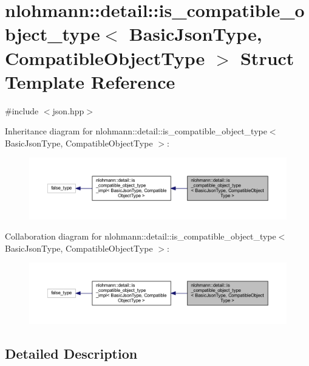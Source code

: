 \hypertarget{structnlohmann_1_1detail_1_1is__compatible__object__type}{}\section{nlohmann\+::detail\+::is\+\_\+compatible\+\_\+object\+\_\+type$<$ Basic\+Json\+Type, Compatible\+Object\+Type $>$ Struct Template Reference}
\label{structnlohmann_1_1detail_1_1is__compatible__object__type}


{\ttfamily \#include $<$json.\+hpp$>$}



Inheritance diagram for nlohmann\+::detail\+::is\+\_\+compatible\+\_\+object\+\_\+type$<$ Basic\+Json\+Type, Compatible\+Object\+Type $>$\+:
\nopagebreak
\begin{figure}[H]
\begin{center}
\leavevmode
\includegraphics[width=350pt]{structnlohmann_1_1detail_1_1is__compatible__object__type__inherit__graph}
\end{center}
\end{figure}


Collaboration diagram for nlohmann\+::detail\+::is\+\_\+compatible\+\_\+object\+\_\+type$<$ Basic\+Json\+Type, Compatible\+Object\+Type $>$\+:
\nopagebreak
\begin{figure}[H]
\begin{center}
\leavevmode
\includegraphics[width=350pt]{structnlohmann_1_1detail_1_1is__compatible__object__type__coll__graph}
\end{center}
\end{figure}


\subsection{Detailed Description}
